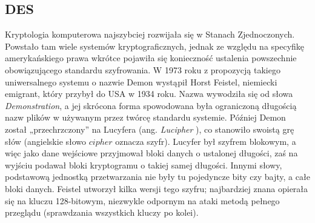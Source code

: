 \documentclass[10pt, letterpaper, titlepage]{article}
\begin{document}
\subsection{DES}
Kryptologia komputerowa najszybciej rozwijała się w Stanach Zjednoczonych. Powstało tam wiele
systemów kryptograficznych, jednak ze względu na specyfikę amerykańskiego prawa wkrótce pojawiła się konieczność ustalenia powszechnie obowiązującego standardu szyfrowania. W 1973 roku
z propozycją takiego uniwersalnego systemu o nazwie Demon wystąpił Horst Feistel, niemiecki
emigrant, który przybył do USA w 1934 roku. Nazwa wywodziła się od słowa \textit{Demonstration}, a jej
skrócona forma spowodowana była ograniczoną długością nazw plików w używanym przez twórcę
standardu systemie. Później Demon został „przechrzczony” na Lucyfera (ang. \textit{Lucipher} ), co stanowiło swoistą grę słów (angielskie słowo $cipher$ oznacza szyfr). Lucyfer był szyfrem blokowym, a
więc jako dane wejściowe przyjmował bloki danych o ustalonej długości, zaś na wyjściu podawał
bloki kryptogramu o takiej samej długości. Innymi słowy, podstawową jednostką przetwarzania
nie były tu pojedyncze bity czy bajty, a całe bloki danych. Feistel utworzył kilka wersji tego szyfru; najbardziej znana opierała się na kluczu 128-bitowym, niezwykle odpornym na ataki metodą
pełnego przeglądu (sprawdzania wszystkich kluczy po kolei).
\end{document}
